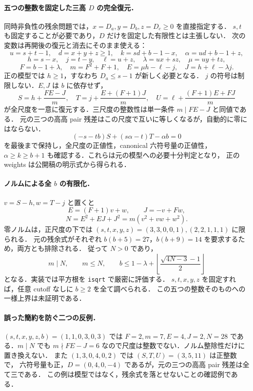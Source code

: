 \paragraph{五つの整数を固定した三高 $D$ の完全復元．}
\label{nhd21:reconstruction}
同時非負性の残余問題では，$x=D_a,y=D_b,z=D_c\ge0$ を直接指定する．
$s,t$ も固定することが必要であり，$D$ だけを固定した有限性とは主張しない．
次の変数は再開後の復元と消去にそのまま使える：
\[
 u=s+t-1,\quad d=x+y+z\ge1,\quad
 k=sd+b-1-x,\quad\alpha=ud+b-1+z,
\]
\[
 h=s-x,\quad j=t-y,\quad\ell=u+z,\quad
 \lambda=ux+sz,\quad\mu=uy+tz,
\]
\[
 F=b-1+\lambda,\quad m=F^2+F+1,\quad
 E=\mu h-\ell-j,\quad J=h+\ell-\lambda j.
\]
正の模型では $h\ge1$，すなわち $D_a\le s-1$ が新しく必要となる．
$j$ の符号は制限しない．$E,J$ は $b$ に依存せず，
\[
 S=h+\frac{FE-J}{m},\quad
 T=j+\frac{E+(F+1)J}{m},\quad
 U=\ell+\frac{(F+1)E+FJ}{m}
\]
が全尺度を一意に復元する．三尺度の整数性は単一条件 $m\mid FE-J$ と同値である．
元の三つの高高 pair 残差はこの尺度で互いに等しくなるが，自動的に零にはならない．
\[
 (-s-tb)S+(s\alpha-t)T-\alpha b=0
\]
を最後まで保持し，全尺度の正値性，canonical 六符号量の正値性，
$\alpha\ge k\ge b+1$ も確認する．これらは元の模型への必要十分判定となり，
正の weights は公開稿の明示式から得られる．

\paragraph{ノルムによる全 $b$ の有限化．}
$v=S-h,w=T-j$ と置くと
\[
 E=(F+1)v+w,\qquad J=-v+Fw,
\]
\[
 N=E^2+EJ+J^2=m(v^2+vw+w^2).
\]
零ノルムは，正尺度の下では
$(s,t,x,y,z)=(3,3,0,0,1),(2,2,1,1,1)$ に限られる．
元の残余式がそれぞれ $b(b+5)=27$，$b(b+9)=14$ を要求するため，両方とも排除される．
従って $N>0$ であり，
\[
 m\mid N,\qquad m\le N,\qquad
 b\le 1-\lambda+
 \left\lfloor\frac{\sqrt{4N-3}-1}{2}\right\rfloor
\]
となる．実装では平方根を \texttt{isqrt} で厳密に評価する．
$s,t,x,y,z$ を固定すれば，任意 cutoff なしに $b\ge2$ を全て調べられる．
この五つの整数そのものへの一様上界は未証明である．

\paragraph{誤った簡約を防ぐ二つの反例．}
$(s,t,x,y,z,b)=(1,1,0,3,0,3)$ では
$F=2,m=7,E=4,J=2,N=28$ である．$m\mid N$ でも
$m\nmid FE-J=6$ なので尺度は整数でない．ノルム整除性だけに置き換えない．
また $(1,3,0,4,0,2)$ では $(S,T,U)=(3,5,11)$ は正整数で，
六符号量も正，$D=(0,4,0,-4)$ であるが，元の三つの高高 pair 残差は全て三である．
この例は模型ではなく，残余式を落とせないことの確認例である．

